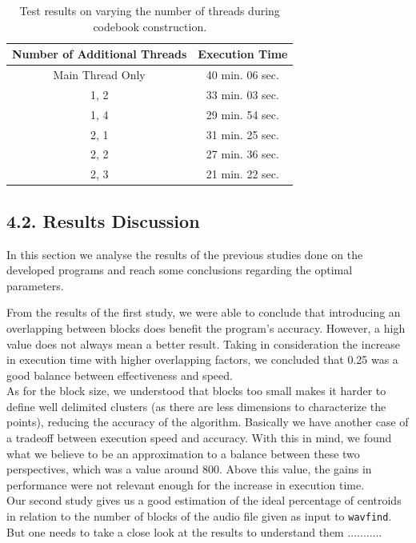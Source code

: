 \documentclass[12pt]{article}
\begin{document}
\begin{table}[H]
  \begin{center}
    \begin{tabular}{c|c}
      \textbf{Number of Additional Threads} & \textbf{Execution Time}\\
      \hline
      Main Thread Only & 40 min. 06 sec.\\
      1, 2 & 33 min. 03 sec.\\
      1, 4 & 29 min. 54 sec.\\
      2, 1 & 31 min. 25 sec.\\
      2, 2 & 27 min. 36 sec.\\
      2, 3 & 21 min. 22 sec.\\
    \end{tabular}
  \end{center}
  \caption{Test results on varying the number of threads during codebook construction.}
  \label{tab:multithreading}
\end{table}

\subsection*{4.2. Results Discussion}

In this section we analyse the results of the previous studies done on the 
developed programs and reach some conclusions regarding the optimal parameters.

From the results of the first study, we were able to conclude that introducing 
an overlapping between blocks does benefit the program's accuracy.
However, a high value does not always mean a better result.
Taking in consideration the increase in execution time with higher overlapping 
factors, we concluded that 0.25 was a good balance between effectiveness and speed. \\

As for the block size, we understood that blocks too small makes it harder to 
define well delimited clusters (as there are less dimensions to characterize the
points), reducing the accuracy of the algorithm.
Basically we have another case of a tradeoff between execution speed and accuracy.
With this in mind, we found what we believe to be an approximation to a balance
between these two perspectives, which was a value around 800. 
Above this value, the gains in performance were not relevant enough for the 
increase in execution time. \\

Our second study gives us a good estimation of the ideal percentage of centroids
in relation to the number of blocks of the audio file given as input to \texttt{wavfind}.
But one needs to take a close look at the results to understand them ........... \\
\end{document}
